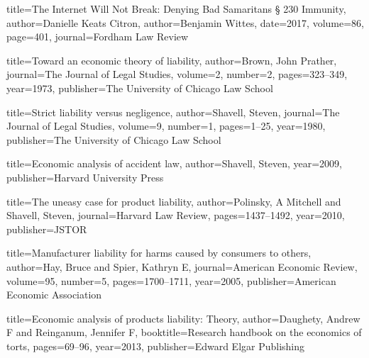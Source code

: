 
{
title={The Internet Will Not Break: Denying Bad Samaritans § 230 Immunity},
author={Danielle Keats Citron},
author={Benjamin Wittes},
date={2017},
volume=86,
page=401,
journal=Fordham Law Review
}



{
  title={Toward an economic theory of liability},
  author={Brown, John Prather},
  journal={The Journal of Legal Studies},
  volume={2},
  number={2},
  pages={323--349},
  year={1973},
  publisher={The University of Chicago Law School}
}

{
  title={Strict liability versus negligence},
  author={Shavell, Steven},
  journal={The Journal of Legal Studies},
  volume={9},
  number={1},
  pages={1--25},
  year={1980},
  publisher={The University of Chicago Law School}
}

{
  title={Economic analysis of accident law},
  author={Shavell, Steven},
  year={2009},
  publisher={Harvard University Press}
}


{
  title={The uneasy case for product liability},
  author={Polinsky, A Mitchell and Shavell, Steven},
  journal={Harvard Law Review},
  pages={1437--1492},
  year={2010},
  publisher={JSTOR}
}

{
  title={Manufacturer liability for harms caused by consumers to others},
  author={Hay, Bruce and Spier, Kathryn E},
  journal={American Economic Review},
  volume={95},
  number={5},
  pages={1700--1711},
  year={2005},
  publisher={American Economic Association}
}

{
  title={Economic analysis of products liability: Theory},
  author={Daughety, Andrew F and Reinganum, Jennifer F},
  booktitle={Research handbook on the economics of torts},
  pages={69--96},
  year={2013},
  publisher={Edward Elgar Publishing}
}


